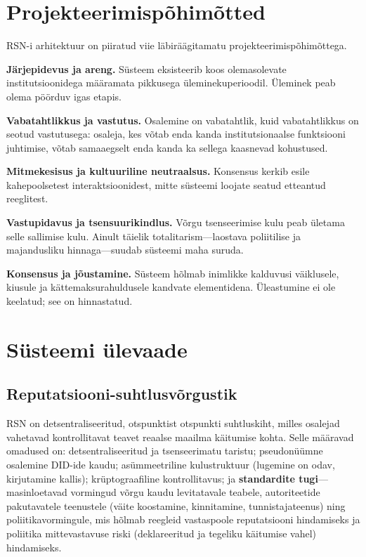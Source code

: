\documentclass[11pt,a4paper,twocolumn]{article}
\begin{document}
\section{Projekteerimispõhimõtted}

RSN-i arhitektuur on piiratud viie läbiräägitamatu projekteerimispõhimõttega.

\textbf{Järjepidevus ja areng.} Süsteem eksisteerib koos olemasolevate institutsioonidega määramata pikkusega üleminekuperioodil. Üleminek peab olema pöörduv igas etapis.

\textbf{Vabatahtlikkus ja vastutus.} Osalemine on vabatahtlik, kuid vabatahtlikkus on seotud vastutusega: osaleja, kes võtab enda kanda institutsionaalse funktsiooni juhtimise, võtab samaaegselt enda kanda ka sellega kaasnevad kohustused.

\textbf{Mitmekesisus ja kultuuriline neutraalsus.} Konsensus kerkib esile kahepoolsetest interaktsioonidest, mitte süsteemi loojate seatud etteantud reeglitest.

\textbf{Vastupidavus ja tsensuurikindlus.} Võrgu tsenseerimise kulu peab ületama selle sallimise kulu. Ainult täielik totalitarism---laostava poliitilise ja majandusliku hinnaga---suudab süsteemi maha suruda.

\textbf{Konsensus ja jõustamine.} Süsteem hõlmab inimlikke kalduvusi väiklusele, kiusule ja kättemaksurahuldusele kandvate elementidena. Üleastumine ei ole keelatud; see on hinnastatud.

\section{Süsteemi ülevaade}

\subsection{Reputatsiooni-suhtlusvõrgustik}

RSN on detsentraliseeritud, otspunktist otspunkti suhtluskiht, milles osalejad vahetavad kontrollitavat teavet reaalse maailma käitumise kohta. Selle määravad omadused on: detsentraliseeritud ja tsenseerimatu taristu; pseudonüümne osalemine DID-ide kaudu; asümmeetriline kulustruktuur (lugemine on odav, kirjutamine kallis); krüptograafiline kontrollitavus; ja \textbf{standardite tugi}---masinloetavad vormingud võrgu kaudu levitatavale teabele, autoriteetide pakutavatele teenustele (väite koostamine, kinnitamine, tunnistajateenus) ning poliitikavormingule, mis hõlmab reegleid vastaspoole reputatsiooni hindamiseks ja poliitika mittevastavuse riski (deklareeritud ja tegeliku käitumise vahel) hindamiseks.
\end{document}
